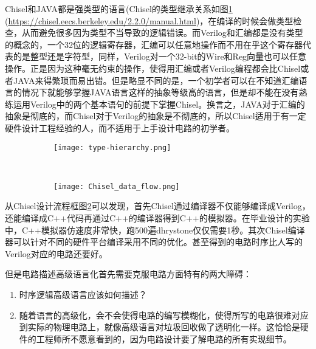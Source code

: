 Chisel和JAVA都是强类型的语言(Chisel的类型继承关系如图\ref{fig:type} (\url{https://chisel.eecs.berkeley.edu/2.2.0/manual.html})，在编译的时候会做类型检查，从而避免很多因为类型不当导致的逻辑错误。而Verilog和汇编都是没有类型的概念的，一个32位的逻辑寄存器，汇编可以任意地操作而不用在乎这个寄存器代表的是整型还是字符型，同样，Verilog对一个32-bit的Wire和Reg向量也可以任意操作。正是因为这种毫无约束的操作，使得用汇编或者Verilog编程都会比Chisel或者JAVA来得繁琐而易出错。但是略显不同的是，一个初学者可以在不知道汇编语言的情况下就能够掌握JAVA语言这样的抽象等级高的语言，但是却不能在没有熟练运用Verilog中的两个基本语句的前提下掌握Chisel。换言之，JAVA对于汇编的抽象是彻底的，而Chisel对于Verilog的抽象是不彻底的，所以Chisel适用于有一定硬件设计工程经验的人，而不适用于上手设计电路的初学者。
\begin{figure}[!htbp]
	\centering
	\begin{subfigure}[b]{0.35\textwidth}
		\texttt{[image: type-hierarchy.png]}
		\caption{}
		\label{fig:type}
	\end{subfigure}%
	~%
	\begin{subfigure}[b]{0.65\textwidth}
		\texttt{[image: Chisel\_data\_flow.png]}
		\caption{}
		\label{fig:design_flow}
	\end{subfigure}
	\label{fig:chisel_into}
\end{figure}

从Chisel设计流程框图\ref{fig:design_flow}可以发现，首先Chisel通过编译器不仅能够编译成Verilog，还能编译成C++代码再通过C++的编译器得到C++的模拟器。在毕业设计的实验中，C++模拟器仿速度非常快，跑500遍dhrystone仅仅需要1秒。其次Chisel编译器可以针对不同的硬件平台编译采用不同的优化。甚至得到的电路时序比人写的Verilog对应的电路还要好。

但是电路描述高级语言化首先需要克服电路方面特有的两大障碍：
\begin{enumerate}[label=(\arabic*)]
	\item 时序逻辑高级语言应该如何描述？
	\item 随着语言的高级化，会不会使得电路的编写模糊化，使得所写的电路很难对应到实际的物理电路上，就像高级语言对垃圾回收做了透明化一样。这恰恰是硬件的工程师所不愿意看到的，因为电路设计要了解电路的所有实现细节。
\end{enumerate}

